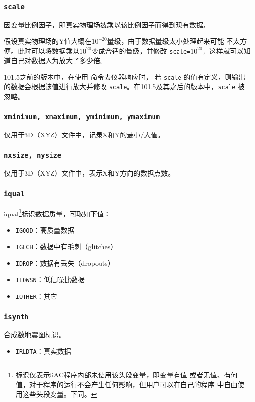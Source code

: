 \subsubsection{\texttt{scale}}
因变量比例因子，即真实物理场被乘以该比例因子而得到现有数据。

假设真实物理场的Y值大概在$10^{-20}$量级，由于数据量级太小处理起来可能
不太方便。此时可以将数据乘以$10^{20}$变成合适的量级，并修改
\texttt{scale=}$10^{20}$，这样就可以知道自己对数据人为放大了多少倍。

101.5之前的版本中，在使用  命令去仪器响应时，
若 \texttt{scale} 的值有定义，则输出的数据会根据该值进行放大并修改
\texttt{scale}。在101.5及其之后的版本中，\texttt{scale} 被忽略。

\subsubsection{\texttt{xminimum, xmaximum, yminimum, ymaximum}}
仅用于3D（XYZ）文件中，记录X和Y的最小/大值。

\subsubsection{\texttt{nxsize, nysize}}
仅用于3D（XYZ）文件中，表示X和Y方向的数据点数。

\subsubsection{\texttt{iqual}\dag}
iqual\footnote{\dag 标识仅表示SAC程序内部未使用该头段变量，即变量有值
或者无值、有何值，对于程序的运行不会产生任何影响，但用户可以在自己的程序
中自由使用这些头段变量。下同。}标识数据质量，可取如下值：
\begin{itemize}
\item \texttt{IGOOD}：高质量数据
\item \texttt{IGLCH}：数据中有毛刺（glitches）
\item \texttt{IDROP}：数据有丢失（dropouts）
\item \texttt{ILOWSN}：低信噪比数据
\item \texttt{IOTHER}：其它
\end{itemize}

\subsubsection{\texttt{isynth}\dag}
合成数地震图标识。
\begin{itemize}
\item \texttt{IRLDTA}：真实数据
\end{itemize}


